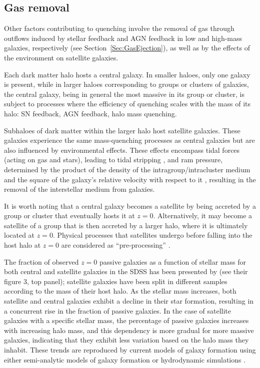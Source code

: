 \documentclass[baaa]{baaa}
\begin{document}
\subsection{Gas removal}

Other factors contributing to quenching involve the removal of gas through outflows induced by stellar feedback and AGN feedback in low and high-mass galaxies, respectively (see Section~\ref{Sec:GasEjection}), as well as by the effects of the environment on satellite galaxies.

Each dark matter halo hosts a central galaxy. In smaller haloes, only one galaxy is present, while in larger haloes corresponding to groups or clusters of galaxies, the central galaxy, being in general the most massive in its group or cluster, is subject to processes where the efficiency of quenching scales with the mass of its halo: SN feedback, AGN feedback, halo mass quenching.

 Subhaloes of dark matter within the larger halo host satellite galaxies. These galaxies experience the same mass-quenching processes as central galaxies but are also influenced by environmental effects. These effects encompass tidal forces (acting on gas and stars), leading to tidal stripping \citep{Merritt_1983}, and ram pressure, determined by the product of the density of the intragroup/intracluster medium and the square of the galaxy's relative velocity with respect to it \citep{GunnGott_1972}, resulting in the removal of the interstellar medium from galaxies.

 It is worth noting that a central galaxy becomes a satellite by being accreted by a group or cluster that eventually hosts it at $z=0$. Alternatively, it may become a satellite of a group that is then accreted by a larger halo, where it is ultimately located at $z=0$. Physical processes that satellites undergo before falling into the host halo at $z=0$ are considered as ``pre-processing'' \citep[e.g.,][]{Wetzel_2013}.

The fraction of observed $z=0$ passive galaxies as a function of stellar mass for both central and satellite galaxies in the SDSS has been presented by \cite{Wetzel_2012} (see their figure 3, top panel); satellite galaxies have been split in different samples according to the mass of their host halo. As the stellar mass increases, both satellite and central galaxies exhibit a decline in their star formation, resulting in a concurrent rise in the fraction of passive galaxies. In the case of satellite galaxies with a specific stellar mass, the percentage of passive galaxies increases with increasing halo mass, and this dependency is more gradual for more massive galaxies, indicating that they exhibit less variation based on the halo mass they inhabit. These trends are reproduced by current models of galaxy formation using either semi-analytic models of galaxy formation \citep[e.g.][]{Cora_2018} or hydrodynamic simulations \citep[e.g.][]{Donnari_2021}.
\end{document}
